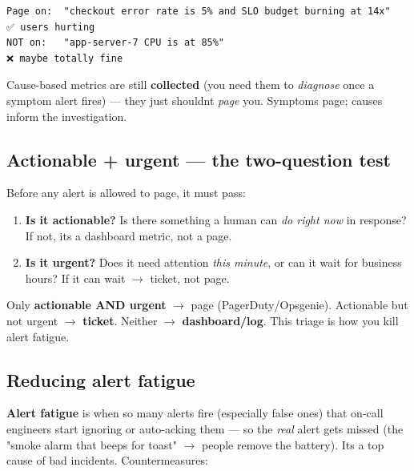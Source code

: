 \documentclass[11pt]{article}
\providecommand{\tightlist}{\setlength{\itemsep}{1pt}\setlength{\parskip}{0pt}}
\begin{document}
\setcodelang{}

\begin{verbatim}
Page on:  "checkout error rate is 5% and SLO budget burning at 14x"   ✅ users hurting
NOT on:   "app-server-7 CPU is at 85%"                                ❌ maybe totally fine
\end{verbatim}

Cause-based metrics are still \textbf{collected} (you need them to \emph{diagnose} once a symptom alert fires) --- they just shouldn\textquotesingle t \emph{page} you. Symptoms page; causes inform the investigation.

\subsection{Actionable + urgent --- the two-question test}\label{actionable--urgent--the-two-question-test}

Before any alert is allowed to page, it must pass:

\begin{enumerate}
\def\labelenumi{\arabic{enumi}.}
\tightlist
\item
  \textbf{Is it actionable?} Is there something a human can \emph{do right now} in response? If not, it\textquotesingle s a dashboard metric, not a page.
\item
  \textbf{Is it urgent?} Does it need attention \emph{this minute}, or can it wait for business hours? If it can wait \(\rightarrow\) ticket, not page.
\end{enumerate}

Only \textbf{actionable AND urgent} \(\rightarrow\) page (PagerDuty/Opsgenie). Actionable but not urgent \(\rightarrow\) \textbf{ticket}. Neither \(\rightarrow\) \textbf{dashboard/log}. This triage is how you kill alert fatigue.

\subsection{Reducing alert fatigue}\label{reducing-alert-fatigue}

\textbf{Alert fatigue} is when so many alerts fire (especially false ones) that on-call engineers start ignoring or auto-acking them --- so the \emph{real} alert gets missed (the "smoke alarm that beeps for toast" \(\rightarrow\) people remove the battery). It\textquotesingle s a top cause of bad incidents. Countermeasures:
\end{document}
